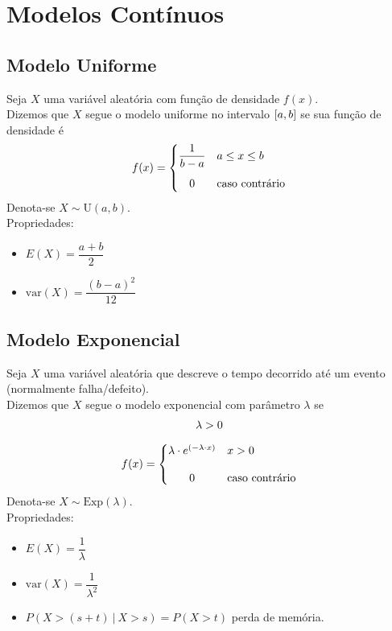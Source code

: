 \documentclass{article}
\begin{document}
\section{Modelos Contínuos}


\subsection{Modelo Uniforme}
Seja $X$ uma variável aleatória com função de densidade $f(x)$. \\
Dizemos que $X$ segue o modelo uniforme no intervalo $[a,b\hspace{0.1pt}]$ se sua função de densidade é
\[
  f(x) = \begin{cases}
          \dfrac{1}{b - a} & a \leq x \leq b \\[10pt]
          \hfil 0 & \text{caso contrário}
         \end{cases} \\[10pt]
\]
Denota-se $X \sim \text{U}(a, b)$. \\[10pt]
Propriedades:
\begin{itemize}
  \item $E(X) = \dfrac{a + b}{2}$
  \item $\text{var}(X) = \dfrac{{(b - a)}^2}{12}$
\end{itemize}


\subsection{Modelo Exponencial}
Seja $X$ uma variável aleatória que descreve o tempo decorrido até um evento (normalmente falha/defeito). \\
Dizemos que $X$ segue o modelo exponencial com parâmetro $\lambda$ se
\begin{gather*}
  \lambda > 0 \\[5pt]
  f(x) = \begin{cases}
          \lambda \cdot e^{(-\lambda \cdot x)} &x > 0 \\[10pt]
          \hfil 0 &\text{caso contrário}
         \end{cases}
\end{gather*}
Denota-se $X \sim \text{Exp}(\lambda)$. \\[10pt]
Propriedades:
\begin{itemize}
  \item $E(X) = \dfrac{1}{\lambda}$
  \item $\text{var}(X) = \dfrac{1}{\lambda^2}$
  \item $P\left(X > (s + t) \:\big|\: X > s \right) = P(X > t)$ \quad\qquad perda de memória.
\end{itemize}
\end{document}
